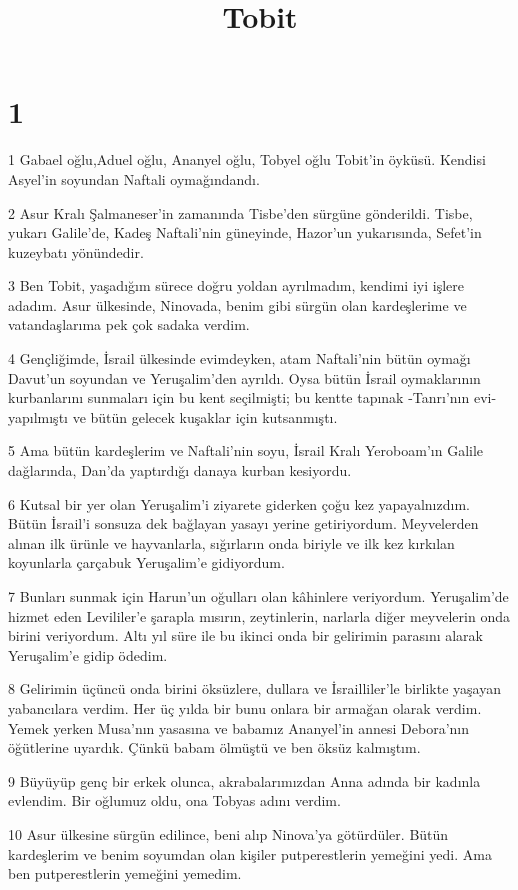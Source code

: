 

\title{Tobit}

\chapter{1}

\par 1 Gabael oğlu,Aduel oğlu, Ananyel oğlu, Tobyel oğlu Tobit'in öyküsü. Kendisi Asyel'in soyundan Naftali oymağındandı.
\par 2 Asur Kralı Şalmaneser'in zamanında Tisbe'den sürgüne gönderildi. Tisbe, yukarı Galile'de, Kadeş Naftali'nin güneyinde, Hazor'un yukarısında, Sefet'in kuzeybatı yönündedir.
\par 3 Ben Tobit, yaşadığım sürece doğru yoldan ayrılmadım, kendimi iyi işlere adadım. Asur ülkesinde, Ninovada, benim gibi sürgün olan kardeşlerime ve vatandaşlarıma pek çok sadaka verdim.
\par 4 Gençliğimde, İsrail ülkesinde evimdeyken, atam Naftali'nin bütün oymağı Davut'un soyundan ve Yeruşalim'den ayrıldı. Oysa bütün İsrail oymaklarının kurbanlarını sunmaları için bu kent seçilmişti; bu kentte tapınak -Tanrı'nın evi- yapılmıştı ve bütün gelecek kuşaklar için kutsanmıştı.
\par 5 Ama bütün kardeşlerim ve Naftali'nin soyu, İsrail Kralı Yeroboam'ın Galile dağlarında, Dan'da yaptırdığı danaya kurban kesiyordu.
\par 6 Kutsal bir yer olan Yeruşalim'i ziyarete giderken çoğu kez yapayalnızdım. Bütün İsrail'i sonsuza dek bağlayan yasayı yerine getiriyordum. Meyvelerden alınan ilk ürünle ve hayvanlarla, sığırların onda biriyle ve ilk kez kırkılan koyunlarla çarçabuk Yeruşalim'e gidiyordum.
\par 7 Bunları sunmak için Harun'un oğulları olan kâhinlere veriyordum. Yeruşalim'de hizmet eden Levililer'e şarapla mısırın, zeytinlerin, narlarla diğer meyvelerin onda birini veriyordum. Altı yıl süre ile bu ikinci onda bir gelirimin parasını alarak Yeruşalim'e gidip ödedim.
\par 8 Gelirimin üçüncü onda birini öksüzlere, dullara ve İsrailliler'le birlikte yaşayan yabancılara verdim. Her üç yılda bir bunu onlara bir armağan olarak verdim. Yemek yerken Musa'nın yasasına ve babamız Ananyel'in annesi Debora'nın öğütlerine uyardık. Çünkü babam ölmüştü ve ben öksüz kalmıştım.
\par 9 Büyüyüp genç bir erkek olunca, akrabalarımızdan Anna adında bir kadınla evlendim. Bir oğlumuz oldu, ona Tobyas adını verdim.
\par 10 Asur ülkesine sürgün edilince, beni alıp Ninova'ya götürdüler. Bütün kardeşlerim ve benim soyumdan olan kişiler putperestlerin yemeğini yedi. Ama ben putperestlerin yemeğini yemedim.
